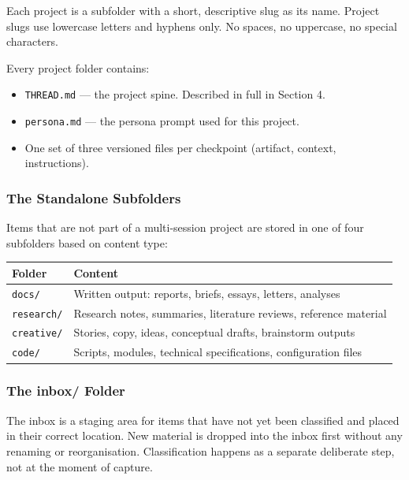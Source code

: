 \documentclass[12pt,letterpaper]{article}
\begin{document}
Each project is a subfolder with a short, descriptive slug as its name.
Project slugs use lowercase letters and hyphens only.
No spaces, no uppercase, no special characters.

Every project folder contains:

\begin{itemize}
  \item \texttt{THREAD.md} --- the project spine. Described in full in Section 4.
  \item \texttt{persona.md} --- the persona prompt used for this project.
  \item One set of three versioned files per checkpoint (artifact, context, instructions).
\end{itemize}

\subsubsection{The Standalone Subfolders}

Items that are not part of a multi-session project are stored in one of four
subfolders based on content type:

\begin{center}
\begin{tabular}{@{}ll@{}}
\toprule
\textbf{Folder} & \textbf{Content} \\
\midrule
\texttt{docs/} & Written output: reports, briefs, essays, letters, analyses \\
\texttt{research/} & Research notes, summaries, literature reviews, reference material \\
\texttt{creative/} & Stories, copy, ideas, conceptual drafts, brainstorm outputs \\
\texttt{code/} & Scripts, modules, technical specifications, configuration files \\
\bottomrule
\end{tabular}
\end{center}

\subsubsection{The inbox/ Folder}

The inbox is a staging area for items that have not yet been classified
and placed in their correct location. New material is dropped into the inbox
first without any renaming or reorganisation. Classification happens
as a separate deliberate step, not at the moment of capture.
\end{document}
